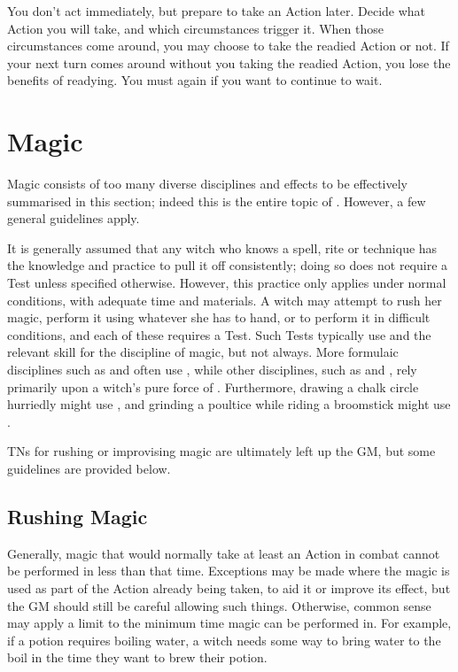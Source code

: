 You don't act immediately, but prepare to take an Action later.
Decide what Action you will take, and which circumstances trigger it.
When those circumstances come around, you may choose to take the readied Action or not.
If your next turn comes around without you taking the readied Action, you lose the benefits of readying.
You must  again if you want to continue to wait.

\section{Magic}

Magic consists of too many diverse disciplines and effects to be effectively summarised in this section; indeed this is the entire topic of .
However, a few general guidelines apply.

It is generally assumed that any witch who knows a spell, rite or technique has the knowledge and practice to pull it off consistently; doing so does not require a Test unless specified otherwise.
However, this practice only applies under normal conditions, with adequate time and materials.
A witch may attempt to rush her magic, perform it using whatever she has to hand, or to perform it in difficult conditions, and each of these requires a Test.
Such Tests typically use  and the relevant skill for the discipline of magic, but not always.
More formulaic disciplines such as  and  often use , while other disciplines, such as  and , rely primarily upon a witch's pure force of .
Furthermore, drawing a chalk circle hurriedly might use , and grinding a poultice while riding a broomstick might use .

TNs for rushing or improvising magic are ultimately left up the GM, but some guidelines are provided below.

\subsection{Rushing Magic}

Generally, magic that would normally take at least an Action in combat cannot be performed in less than that time.
Exceptions may be made where the magic is used as part of the Action already being taken, to aid it or improve its effect, but the GM should still be careful allowing such things.
Otherwise, common sense may apply a limit to the minimum time magic can be performed in.
For example, if a potion requires boiling water, a witch needs some way to bring water to the boil in the time they want to brew their potion.

